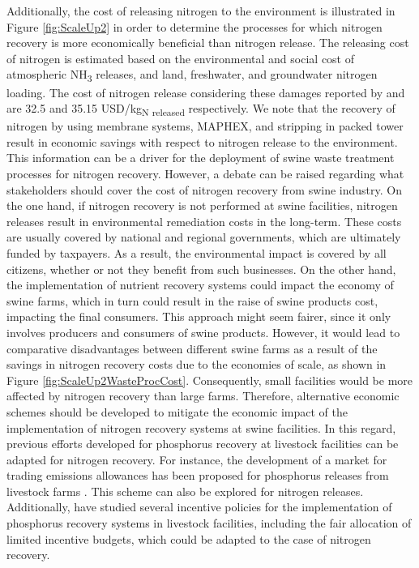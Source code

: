 \begin{refsection}[referencesCh6]
Additionally, the cost of releasing nitrogen to the environment is illustrated in Figure \ref{fig:ScaleUp2} in order to determine the processes for which nitrogen recovery is more economically beneficial than nitrogen release. The releasing cost of nitrogen is estimated based on the environmental and social cost of atmospheric NH\textsubscript{3} releases, and land, freshwater, and groundwater nitrogen loading. The cost of nitrogen release considering these damages reported by \citet{sobota2015cost} and \citet{compton2017assessing} are 32.5 and 35.15 USD/kg\textsubscript{N released} respectively. We note that the recovery of nitrogen by using membrane systems, MAPHEX, and stripping in packed tower result in economic savings with respect to nitrogen release to the environment. This information can be a driver for the deployment of swine waste treatment processes for nitrogen recovery. However, a debate can be raised regarding what stakeholders should cover the cost of nitrogen recovery from swine industry. 
On the one hand, if nitrogen recovery is not performed at swine facilities, nitrogen releases result in environmental remediation costs in the long-term. These costs are usually covered by national and regional governments, which are ultimately funded by taxpayers. As a result, the environmental impact is covered by all citizens, whether or not they benefit from such businesses. On the other hand, the implementation of nutrient recovery systems could impact the economy of swine farms, which in turn could result in the raise of swine products cost, impacting the final consumers. This approach might seem fairer, since it only involves producers and consumers of swine products. However, it would lead to comparative disadvantages between different swine farms as a result of the savings in nitrogen recovery costs due to the economies of scale, as shown in Figure \ref{fig:ScaleUp2WasteProcCost}. Consequently, small facilities would be more affected by nitrogen recovery than large farms. Therefore, alternative economic schemes should be developed to mitigate the economic impact of the implementation of nitrogen recovery systems at swine facilities. In this regard, previous efforts developed for phosphorus recovery at livestock facilities can be adapted for nitrogen recovery. For instance, the development of a market for trading emissions allowances has been proposed for phosphorus releases from livestock farms \citep{Sampat2}. This scheme can also be explored for nitrogen releases. Additionally, {} have studied several incentive policies for the implementation of phosphorus recovery systems in livestock facilities, including the fair allocation of limited incentive budgets, which could be adapted to the case of nitrogen recovery.


\end{refsection}
